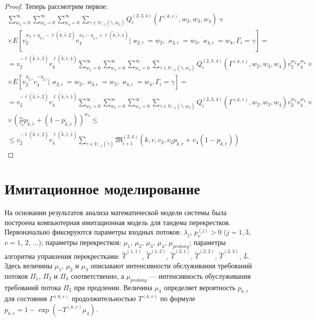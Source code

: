 \documentclass[a4paper,12pt,russian]{extarticle}
\begin{document}
\begin{proof}
Теперь рассмотрим первое:
\begin{multline}
     \sum_{w_2=0}^{\infty} \sum_{w_3=0}^{\infty} \sum_{w_4=0}^{\infty}  \sum_{\gamma \in {\mathbb H}_{-1}(\tilde{\gamma},w_3)}   Q^{(2,3,4)}_i(\Gamma^{(k,r)}, w_2, w_3,w_4)
\times \\ \times E[ v_2^{ w_{2} + \eta_{2,i} - \ell(\tilde{k},\tilde{r},2) }  v_4^{w_4 - \eta_{2,i} + \ell(\tilde{k},\tilde{r},1)} |   \varkappa_{2,i}=w_2, \varkappa_{3,i}=w_3, \varkappa_{4,i}=w_4, \Gamma_i=\gamma] =\\
=
v_2^{ - \ell(\tilde{k},\tilde{r},2)} v_4^{\ell(\tilde{k},\tilde{r},1)} 
\sum_{w_2=0}^{\infty} \sum_{w_3=0}^{\infty} \sum_{w_4=0}^{\infty}  \sum_{\gamma \in {\mathbb H}_{-1}(\tilde{\gamma},w_3)}   Q^{(2,3,4)}_i(\Gamma^{(k,r)}, w_2, w_3,w_4) v_2^{w_2} v_4^{w_4}
\times \\ \times E[ v_2^{  \eta_{2,i}  }  v_4^{ - \eta_{2,i}} |   \varkappa_{2,i}=w_2, \varkappa_{3,i}=w_3, \varkappa_{4,i}=w_4, \Gamma_i=\gamma] = \\
=
v_2^{ - \ell(\tilde{k},\tilde{r},2)} v_4^{\ell(\tilde{k},\tilde{r},1)} 
\sum_{w_2=0}^{\infty} \sum_{w_3=0}^{\infty} \sum_{w_4=0}^{\infty}  \sum_{\gamma \in {\mathbb H}_{-1}(\tilde{\gamma},w_3)}   Q^{(2,3,4)}_i(\Gamma^{(k,r)}, w_2, w_3,w_4) v_2^{w_2} v_4^{w_4}
\times \\ \times (\frac{v_2}{v_4} p_{\tilde{k},\tilde{r}} + (1-p_{\tilde{k},\tilde{r}}))^{w_4} \leqslant \\
\leqslant
v_2^{ - \ell(\tilde{k},\tilde{r},2)} v_4^{\ell(\tilde{k},\tilde{r},1)}  \sum_{\gamma \in {\mathbb H}_{-1}(\tilde{\gamma})} 
\mathfrak{M}^{(2,4)}_{i+1}(k,r, v_2,v_2 p_{\tilde{k},\tilde{r}} + v_4(1-p_{\tilde{k},\tilde{r}}))
\end{multline}
\end{proof}
















\section{Имитационное моделирование}

На основании результатов анализа математической модели системы была построена компьютерная имитационная модель для тандема перекрестков. Первоначально фиксируются параметры входных потоков:
$\lambda_j$,  $p_{\nu}^{(j)}>0$ ($j=1,3$, $\nu=1$, $2$, $\ldots$); параметры перекрестков: $\mu_1$, $\mu_2$,  $\mu_3$, $\mu_4$, $\mu_{prolong}$; параметры алгоритма управления перекрестками: $\widetilde T^{(1,1)}$, $\widetilde T^{(1,2)}$, $\widetilde T^{(2,1)}$, $\widetilde T^{(2,2)}$, $\widetilde T^{(2,3)}$, $L$. Здесь величины $\mu_1$, $\mu_2$ и $\mu_3$  описывают интенсивности обслуживания требований потоков $\Pi_1$, $\Pi_2$ и $\Pi_3$ соответственно, а $\mu_{prolong}$ --- интенсивность обуслуживания требований потока $\Pi_2$ при продлении. Величина $\mu_4$ определяет вероятность $p_{k,r}$ для состояния $\Gamma^{(k,r)}$ продолжительностью $T^{(k,r)}$ по формуле $p_{k,r} = 1- \exp{(- T^{(k,r)} \mu_4)}$.  
\end{document}
